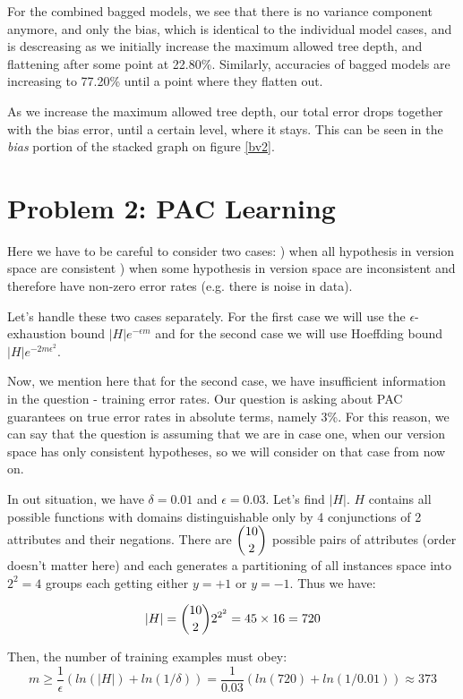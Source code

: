 \documentclass{article}
\begin{document}
For the combined bagged models, we see that there is no variance component anymore, and only the bias, which is identical to the individual model cases, and is descreasing as we initially increase the maximum allowed tree depth, and flattening after some point at 22.80\%. Similarly, accuracies of bagged models are increasing to 77.20\% until a point where they flatten out.

As we increase the maximum allowed tree depth, our total error drops together with the bias error, until a certain level, where it stays. This can be seen in the \emph{bias} portion of the stacked graph on figure \ref{bv2}.


\section*{Problem 2: PAC Learning}

Here we have to be careful to consider two cases:
) when all hypothesis in version space are consistent
) when some hypothesis in version space are inconsistent and therefore have non-zero error rates (e.g. there is noise in data).

Let's handle these two cases separately. For the first case we will use the $\epsilon$-exhaustion bound $|H|e^{-\epsilon m}$ and for the second case we will use Hoeffding bound $|H|e^{-2m\epsilon^2}$.

Now, we mention here that for the second case, we have insufficient information in the question - training error rates. Our question is asking about PAC guarantees on true error rates in absolute terms, namely 3\%. For this reason, we can say that the question is assuming that we are in case one, when our version space has only consistent hypotheses, so we will consider on that case from now on.

In out situation, we have $\delta = 0.01$ and $\epsilon = 0.03$. Let's find $|H|$. $H$ contains all possible functions with domains distinguishable only by 4 conjunctions of 2 attributes and their negations. There are $\dbinom{10}{2}$ possible pairs of attributes (order doesn't matter here) and each generates a partitioning of all instances space into $2^2=4$ groups each getting either $y=+1$ or $y=-1$. Thus we have:

$$|H| = \dbinom{10}{2} 2^{2^2} = 45 \times 16 = 720$$

Then, the number of training examples must obey:
$$ m \geq \frac{1}{\epsilon} (ln(|H|) + ln(1/\delta)) = \frac{1}{0.03} (ln(720) + ln(1/0.01)) \approx 373$$
\end{document}

